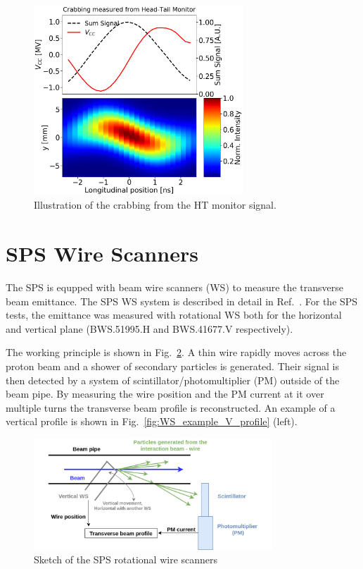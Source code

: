 \begin{figure}[!h]
   \centering         
   \includegraphics[width=0.7\textwidth]{images/Ch4/HT_crabVoltage__20180530_135105_crabbing_only.png}
       \caption{Illustration of the crabbing from the HT monitor signal.}
       \label{fig:crabbing_reconstruction_HT_monitor}
\end{figure}
   



\section{SPS Wire Scanners}

The SPS is equpped with beam wire scanners (WS) to measure the transverse beam emittance. The SPS WS system is described in detail in Ref.~\cite{BOSSER1985475, Berrig:1972478}. For the SPS tests, the emittance was measured with rotational WS both for the horizontal and vertical plane (BWS.51995.H and BWS.41677.V respectively).

The working principle is shown in Fig.~\ref{fig:SPS_WS_ROT}. A thin wire rapidly moves across the proton beam and a shower of secondary particles is generated. Their signal is then detected by a system of scintillator/photomultiplier (PM) outside of the beam pipe. By measuring the wire position and the PM current at it over multiple turns the transverse beam profile is reconstructed. An example of a vertical profile is shown in Fig.~\ref{fig:WS_example_V_profile} (left).


\begin{figure}[!h]
   \centering         
   \includegraphics[width=0.8\textwidth]{images/Ch4/Wire_scanner.png}
       \caption{Sketch of the SPS rotational wire scanners~\cite{Berrig:1972478}}
       \label{fig:SPS_WS_ROT}
\end{figure}


